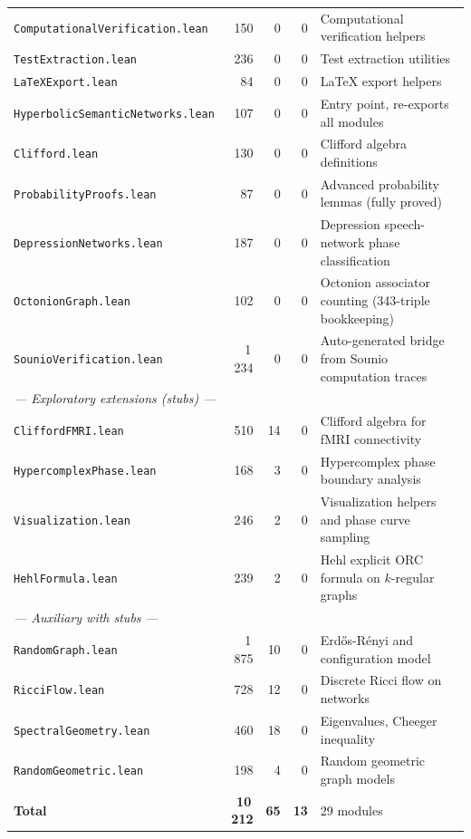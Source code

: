 \documentclass[12pt]{article}
\begin{document}
\begin{table}[ht]
\begin{tabular}{l r r r p{5.8cm}}
\texttt{ComputationalVerification.lean} & 150 & 0 & 0 & Computational verification helpers \\
\texttt{TestExtraction.lean}      & 236 & 0 & 0 & Test extraction utilities \\
\texttt{LaTeXExport.lean}         & 84  & 0 & 0 & \LaTeX{} export helpers \\
\texttt{HyperbolicSemanticNetworks.lean} & 107 & 0 & 0 & Entry point, re-exports all modules \\
\texttt{Clifford.lean}            & 130 & 0 & 0 & Clifford algebra definitions \\
\texttt{ProbabilityProofs.lean}   & 87  & 0 & 0 & Advanced probability lemmas (fully proved) \\
\texttt{DepressionNetworks.lean}  & 187 & 0 & 0 & Depression speech-network phase classification \\
\texttt{OctonionGraph.lean}       & 102 & 0 & 0 & Octonion associator counting (343-triple bookkeeping) \\
\texttt{SounioVerification.lean}  & 1\,234 & 0 & 0 & Auto-generated bridge from Sounio computation traces \\
\midrule
\multicolumn{5}{l}{\itshape --- Exploratory extensions (stubs) ---} \\
\texttt{CliffordFMRI.lean}        & 510 & 14 & 0 & Clifford algebra for fMRI connectivity \\
\texttt{HypercomplexPhase.lean}   & 168 &  3 & 0 & Hypercomplex phase boundary analysis \\
\texttt{Visualization.lean}       & 246 &  2 & 0 & Visualization helpers and phase curve sampling \\
\texttt{HehlFormula.lean}         & 239 &  2 & 0 & Hehl explicit ORC formula on $k$-regular graphs \\
\midrule
\multicolumn{5}{l}{\itshape --- Auxiliary with stubs ---} \\
\texttt{RandomGraph.lean}         & 1\,875 & 10 & 0 & Erd\H{o}s-R\'{e}nyi and configuration model \\
\texttt{RicciFlow.lean}           &   728  & 12 & 0 & Discrete Ricci flow on networks \\
\texttt{SpectralGeometry.lean}    &   460  & 18 & 0 & Eigenvalues, Cheeger inequality \\
\texttt{RandomGeometric.lean}     &   198  &  4 & 0 & Random geometric graph models \\
\midrule
\textbf{Total} & \textbf{10\,212} & \textbf{65} & \textbf{13} & 29 modules \\
\bottomrule
\end{tabular}
\end{table}
\end{document}
